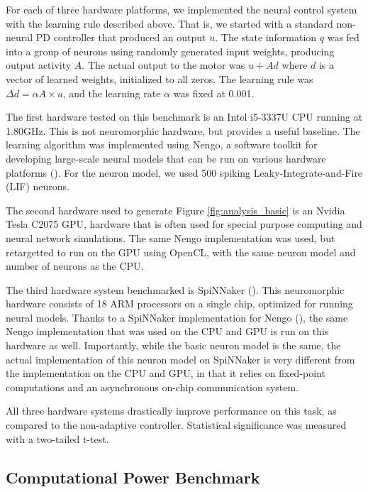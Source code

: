 \documentclass{frontiersSCNS} %
\begin{document}
For each of three hardware platforms, we implemented the neural control
system with the learning rule described above.  That is, we started with a
standard non-neural PD controller that produced an output $u$.  The state
information $q$ was fed into a group of neurons using randomly generated
input weights, producing output activity $A$.  The actual output to the motor
was $u+Ad$ where $d$ is a vector of learned weights, initialized to all
zeros.  The learning rule was $\Delta d=\alpha A \times u$, and the
learning rate $\alpha$ was fixed at 0.001.  

The first hardware tested on this benchmark is an Intel i5-3337U CPU running
at 1.80GHz.  This is not neuromorphic hardware, but provides a
useful baseline.  The learning algorithm was implemented using Nengo,
a software toolkit for developing large-scale neural models that can be run
on various hardware platforms (\citealt{nengo}).  For the neuron model, we used
500 spiking Leaky-Integrate-and-Fire (LIF) neurons.

The second hardware used to generate Figure \ref{fig:analysis_basic} is an
Nvidia Tesla C2075 GPU, hardware that is often used for special purpose computing
and neural network simulations.  The same Nengo implementation was used, but
retargetted to run on the GPU using OpenCL, with the same neuron model and
number of neurons as the CPU.

The third hardware system benchmarked is SpiNNaker (\citealt{furber2014}).  This
neuromorphic hardware consists of 18 ARM processors on a single chip, 
optimized for running neural models.  Thanks to a SpiNNaker implementation
for Nengo (\citealt{mundy2015}), the same Nengo implementation that was used on the
CPU and GPU is run on this hardware as well.  Importantly, while the
basic neuron model is the same, the actual implementation of this neuron model on
SpiNNaker is very different from the implementation on the CPU and GPU, in
that it relies on fixed-point computations and an asynchronous on-chip
communication system.

All three hardware systems drastically improve performance on this task, as
compared to the non-adaptive controller.  Statistical significance was
measured with a two-tailed t-test.

\subsection{Computational Power Benchmark}
\end{document}
